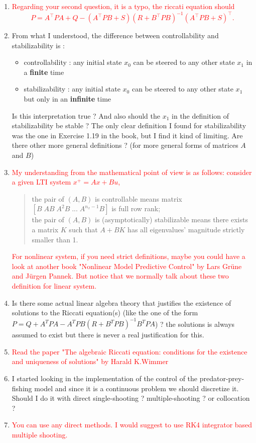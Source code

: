 \documentclass[12pt]{article}
\numberwithin{theorem}{section} %
\theoremstyle{definition}
\theoremstyle{remark}
\begin{document}
\begin{enumerate}
	\item[] \textcolor{red}{Regarding your second question, it is a typo, the riccati equation should
	\[
	P = A^\top P A +Q - (A^\top PB + S)(R+B^\top P B)^{-1}(A^\top PB + S)^\top.
	\]}
	\item From what I understood, the difference between controllability and stabilizability is :
	\begin{itemize}[label=\textbullet]
		\item controllability : any initial state $x_0$ can be steered to any other state $x_1$ in a \textbf{finite} time
		\item stabilizability : any initial state $x_0$ can be steered to any other state $x_1$ but only in an \textbf{infinite} time
	\end{itemize}
	Is this interpretation true ?
	And also should the $x_1$ in the definition of stabilizability be stable ?
	The only clear definition I found for stabilizability was the one in Exercise 1.19 in the book, but I find it kind of limiting. Are there other more general definitions ? (for more general forms of matrices $A$ and $B$)
    \item[] \textcolor{red}{My understanding from the mathematical point of view is as follows: consider a given LTI system $x^+ = A x+ Bu$,
    \begin{quote}
        the pair of $(A,B)$ is controllable means matrix $[B\;AB\;A^2B\;...\;A^{n_x-1}B]$ is full row rank;\\
        the pair of $(A,B)$ is (asymptotically) stabilizable means there exists a matrix $K$ such that $A+BK$ has all eigenvalues' magnitude strictly smaller than 1.
    \end{quote}
    For nonlinear system, if you need strict definitions, maybe you could have a look at another book "Nonlinear Model Predictive Control" by Lars Grüne and Jürgen Pannek. But notice that we normally talk about these two definition for linear system.}

	\item Is there some actual linear algebra theory that justifies the existence of solutions to the Riccati equation(s) (like the one of the form $P=Q+A^TPA-A^TPB(R+B^TPB)^{-1}B^TPA$) ? the solutions is always assumed to exist but there is never a real justification for this.
    \item[] \textcolor{red}{Read the paper "The algebraic Riccati equation: conditions for the existence and uniqueness of solutions" by Harald K.Wimmer}
	\item I started looking in the implementation of the control of the predator-prey-fishing model and since it is a continuous problem we should discretize it.
	Should I do it with direct single-shooting ? multiple-shooting ? or collocation ?
	\item[] \textcolor{red}{You can use any direct methods. I would suggest to use RK4 integrator based multiple shooting.}
\end{enumerate}
\end{document}
